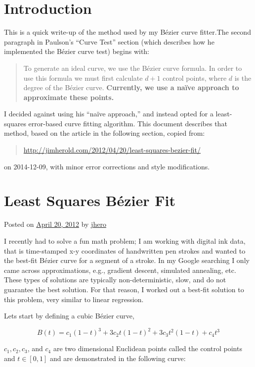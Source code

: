 \documentclass{article}
\begin{document}
\section{Introduction}

This is a quick write-up of the method used by my B\'ezier curve fitter.The second paragraph in Paulson's ``Curve Test'' section (which describes how he implemented the B\'ezier curve test) begins with:
\begin{quote}
  To generate an ideal curve, we use the B\'ezier curve formula. In order to use this formula we must first calculate $d+1$ control points, where $d$ is the degree of the B\'ezier curve.  \textbf{Currently, we use a na\"ive approach to approximate these points.}
\end{quote}
I decided against using his ``na\"ive approach,'' and instead opted for a least-squares error-based curve fitting algorithm.  This document describes that method, based on the article in the following section, copied from:
\begin{quote}
  \url{http://jimherold.com/2012/04/20/least-squares-bezier-fit/}
\end{quote}
on 2014-12-09, with minor error corrections and style modifications.

\section{Least Squares B\'ezier Fit}

Posted on \href{http://jimherold.com/2012/04/20/least-squares-bezier-fit/}{April 20, 2012} by \href{jimherold.com/author/jhero}{jhero}

I recently had to solve a fun math problem; I am working with digital ink data, that is time-stamped x-y coordinates of handwritten pen strokes and wanted to the best-fit B\'ezier curve for a segment of a stroke. In my Google searching I only came across approximations, e.g., gradient descent, simulated annealing, etc. These types of solutions are typically non-deterministic, slow, and do not guarantee the best solution. For that reason, I worked out a best-fit solution to this problem, very similar to linear regression.

Lets start by defining a cubic B\'ezier curve,

\[B(t)=c_1(1-t)^3+3c_2t(1-t)^2+3c_3t^2(1-t)+c_4t^3\]

$c_1, c_2, c_3$, and $c_4$ are two dimensional Euclidean points called the control points and $t\in[0,1]$ and are demonstrated in the following curve:
\end{document}
